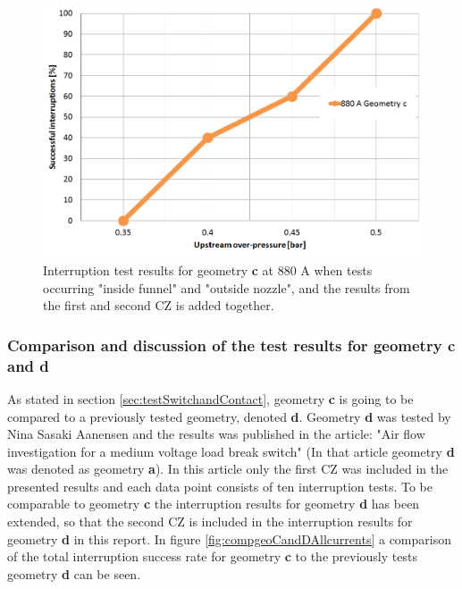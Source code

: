 \documentclass[10pt,b5paper,twoside]{article}
\begin{document}

\begin{figure}[H]
\centering
\includegraphics[scale=0.45]{Bilder/Results/geoC880amp.PNG}
\caption{Interruption test results for geometry \textbf{c} at 880 A when tests occurring "inside funnel" and "outside nozzle", and the results from the first and second CZ is added together.} \label{fig:results880AgeoC}
\end{figure}

\subsubsection{Comparison and discussion of the test results for geometry \textbf{c} and \textbf{d}}

As stated in section \ref{sec:testSwitchandContact}, geometry \textbf{c} is going to be compared to a previously tested geometry, denoted \textbf{d}. Geometry \textbf{d} was tested by Nina Sasaki Aanensen and the results was published in the article: "Air flow investigation for a medium voltage load break switch" \cite{bib:AFIMVLBA} (In that article geometry \textbf{d} was denoted as geometry \textbf{a}). In this article only the first CZ was included in the presented results and each data point consists of ten interruption tests. To be comparable to geometry \textbf{c} the interruption results for geometry \textbf{d} has been extended, so that the second CZ is included in the interruption results for geometry \textbf{d} in this report. In figure \ref{fig:compgeoCandDAllcurrents} a comparison of the total interruption success rate for geometry \textbf{c} to the previously tests geometry \textbf{d} can be seen.
\end{document}
